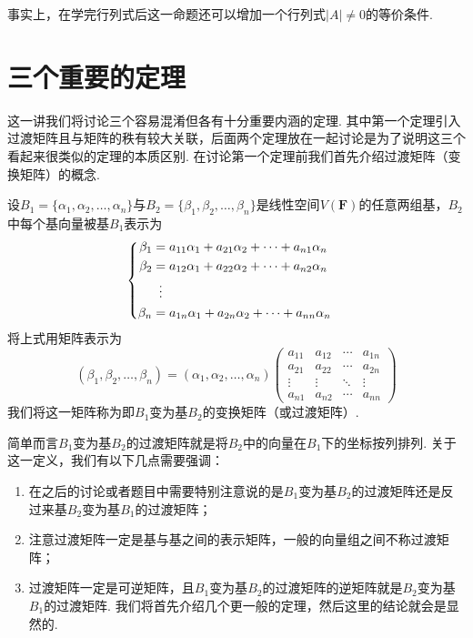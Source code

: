 事实上，在学完行列式后这一命题还可以增加一个行列式$|A|\neq 0$的等价条件.

\section{三个重要的定理}

这一讲我们将讨论三个容易混淆但各有十分重要内涵的定理. 其中第一个定理引入过渡矩阵且与矩阵的秩有较大关联，后面两个定理放在一起讨论是为了说明这三个看起来很类似的定理的本质区别. 在讨论第一个定理前我们首先介绍过渡矩阵（变换矩阵）的概念.
\begin{definition}{}{}
    设$B_1=\{\alpha_1,\alpha_2,\ldots,\alpha_n\}$与$B_2=\{\beta_1,\beta_2,\ldots,\beta_n\}$是线性空间$V(\mathbf{F})$的任意两组基，$B_2$中每个基向量被基$B_1$表示为
    \[ \begin{cases} \begin{aligned}
                \beta_1 & = a_{11}\alpha_1+a_{21}\alpha_2+\cdots+a_{n1}\alpha_n \\
                \beta_2 & = a_{12}\alpha_1+a_{22}\alpha_2+\cdots+a_{n2}\alpha_n \\
                        & \vdotswithin{=}                                       \\
                \beta_n & = a_{1n}\alpha_1+a_{2n}\alpha_2+\cdots+a_{nn}\alpha_n
            \end{aligned} \end{cases} \]
    将上式用矩阵表示为
    \[(\beta_1,\beta_2,\ldots,\beta_n)=(\alpha_1,\alpha_2,\ldots,\alpha_n)\begin{pmatrix}
            a_{11} & a_{12} & \cdots & a_{1n} \\
            a_{21} & a_{22} & \cdots & a_{2n} \\
            \vdots & \vdots & \ddots & \vdots \\
            a_{n1} & a_{n2} & \cdots & a_{nn}
        \end{pmatrix}\]
    我们将这一矩阵称为即$B_1$变为基$B_2$的变换矩阵（或过渡矩阵）.
\end{definition}
简单而言$B_1$变为基$B_2$的过渡矩阵就是将$B_2$中的向量在$B_1$下的坐标按列排列. 关于这一定义，我们有以下几点需要强调：
\begin{enumerate}
    \item 在之后的讨论或者题目中需要特别注意说的是$B_1$变为基$B_2$的过渡矩阵还是反过来基$B_2$变为基$B_1$的过渡矩阵；

    \item 注意过渡矩阵一定是基与基之间的表示矩阵，一般的向量组之间不称过渡矩阵；

    \item 过渡矩阵一定是可逆矩阵，且$B_1$变为基$B_2$的过渡矩阵的逆矩阵就是$B_2$变为基$B_1$的过渡矩阵. 我们将首先介绍几个更一般的定理，然后这里的结论就会是显然的.
\end{enumerate}

